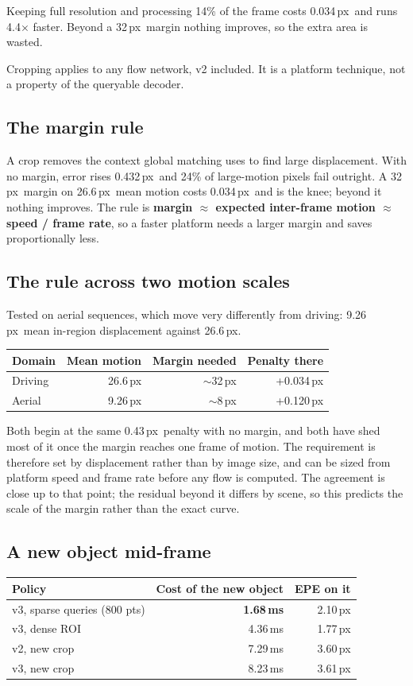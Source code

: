 \documentclass[11pt,a4paper]{article}
\newcommand{\px}{\,px}
\newcommand{\ms}{\,ms}
\begin{document}
Keeping full resolution and processing 14\% of the frame costs 0.034\px\ and runs
4.4$\times$ faster. Beyond a 32\px\ margin nothing improves, so the extra area is
wasted.

Cropping applies to any flow network, v2 included. It is a platform technique,
not a property of the queryable decoder.

\subsection{The margin rule}
A crop removes the context global matching uses to find large displacement. With
no margin, error rises 0.432\px\ and 24\% of large-motion pixels fail outright. A
32\px\ margin on 26.6\px\ mean motion costs 0.034\px\ and is the knee; beyond it
nothing improves. The rule is \textbf{margin $\approx$ expected inter-frame
motion $\approx$ speed / frame rate}, so a faster platform needs a larger margin
and saves proportionally less.

\subsection{The rule across two motion scales}
Tested on aerial sequences, which move very differently from driving: 9.26\px\
mean in-region displacement against 26.6\px.

\begin{center}
\small
\begin{tabular}{lrrr}
\toprule
Domain & Mean motion & Margin needed & Penalty there \\
\midrule
Driving & 26.6\px & $\sim$32\px & +0.034\px \\
Aerial & 9.26\px & $\sim$8\px & +0.120\px \\
\bottomrule
\end{tabular}
\end{center}

Both begin at the same 0.43\px\ penalty with no margin, and both have shed most
of it once the margin reaches one frame of motion. The requirement is therefore
set by displacement rather than by image size, and can be sized from platform
speed and frame rate before any flow is computed. The agreement is close up to
that point; the residual beyond it differs by scene, so this predicts the scale
of the margin rather than the exact curve.

\subsection{A new object mid-frame}
\begin{center}
\small
\begin{tabular}{lrr}
\toprule
Policy & Cost of the new object & EPE on it \\
\midrule
v3, sparse queries (800 pts) & \textbf{1.68\ms} & 2.10\px \\
v3, dense ROI & 4.36\ms & 1.77\px \\
v2, new crop & 7.29\ms & 3.60\px \\
v3, new crop & 8.23\ms & 3.61\px \\
\bottomrule
\end{tabular}
\end{center}
\end{document}
